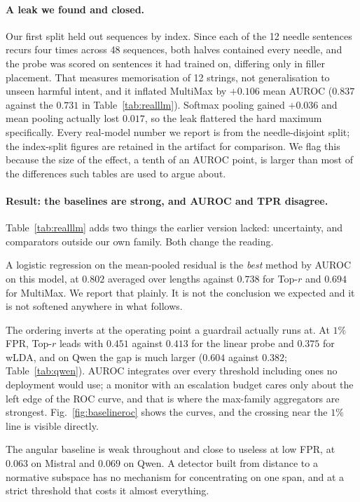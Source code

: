 \documentclass[10pt]{article}
\theoremstyle{plain}
\theoremstyle{definition}
\theoremstyle{remark}
\begin{document}
\paragraph{A leak we found and closed.} Our first split held out sequences by index. Since
each of the 12 needle sentences recurs four times across 48 sequences, both halves
contained every needle, and the probe was scored on sentences it had trained on, differing
only in filler placement. That measures memorisation of 12 strings, not generalisation to
unseen harmful intent, and it inflated MultiMax by $+0.106$ mean AUROC ($0.837$ against
the $0.731$ in Table~\ref{tab:realllm}). Softmax pooling gained $+0.036$ and mean pooling
actually lost $0.017$, so the leak flattered the hard maximum specifically. Every real-model
number we report is from the needle-disjoint split; the index-split figures are retained in
the artifact for comparison. We flag this because the size of the effect, a tenth of an
AUROC point, is larger than most of the differences such tables are used to argue about.

\paragraph{Result: the baselines are strong, and AUROC and TPR disagree.}
Table~\ref{tab:realllm} adds two things the earlier version lacked: uncertainty, and
comparators outside our own family. Both change the reading.

A logistic regression on the mean-pooled residual is the \emph{best} method by AUROC on
this model, at $0.802$ averaged over lengths against $0.738$ for Top-$r$ and $0.694$ for
MultiMax. We report that plainly. It is not the conclusion we expected and it is not
softened anywhere in what follows.

The ordering inverts at the operating point a guardrail actually runs at. At $1\%$ FPR,
Top-$r$ leads with $0.451$ against $0.413$ for the linear probe and $0.375$ for wLDA, and
on Qwen the gap is much larger ($0.604$ against $0.382$; Table~\ref{tab:qwen}). AUROC
integrates over every threshold including ones no deployment would use; a monitor with an
escalation budget cares only about the left edge of the ROC curve, and that is where the
max-family aggregators are strongest. Fig.~\ref{fig:baselineroc} shows the curves, and the
crossing near the $1\%$ line is visible directly.

The angular baseline is weak throughout and close to useless at low FPR, at $0.063$ on
Mistral and $0.069$ on Qwen. A detector built from distance to a normative subspace has no
mechanism for concentrating on one span, and at a strict threshold that costs it almost
everything.
\end{document}
